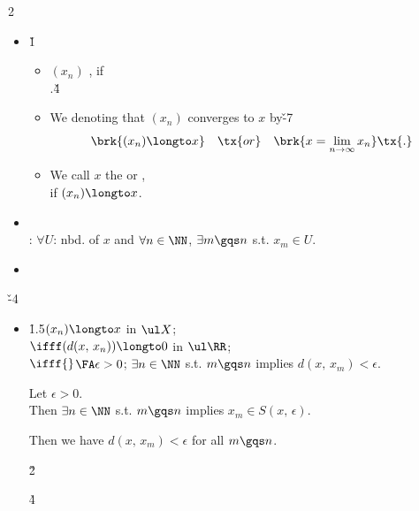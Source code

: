 \documentclass[dvipdfmx,a4paper,titlepage,9pt]{jsarticle}
\begin{document}
\begin{multicols*}{2}
\begin{itemize}[label=-]
\item{}\v1
\begin{itemize}[label=\Cdot]
\setlength{\leftskip}{-5pt}
\item $(x_n)$ , if \\
.\v4

\item We denoting that $(x_n)$ converges to $x$ by\v{-7}
$$\brk{(x_n)\longto x}\quad\tx{or}\quad \brk{x=\lim_{n\to\infty}x_n}\tx{.}$$

\item We call $x$ the  or , \\
if $(x_n)\longto x$.\\
\end{itemize}

\item{}\\
: $\forall U$: nbd. of $x$ and $\forall n\in\NN$, $\exists m\gqs n$ s.t. $x_m\in U$.\\

\item[]
\end{itemize}

\newpage

\v{-4}
\begin{itemize}[label=-]
\item \qquad\h{1.5}$(x_n)\longto x$ in $\ul X$; \\
$\ifff (d(x,\,x_n))\longto 0$ in $\ul \RR$; \\
$\ifff{}$$\FA\epsilon>0$; $\exists n\in\NN$ s.t. $m\gqs n$ implies $d(x,\,x_m)<\epsilon$.

\begin{Pfbox}[]
\ti{[(a)${}\Longto{}$(c)]} Let $\epsilon>0$. \\
Then $\exists n\in\NN$ s.t. $m\gqs n$ implies $x_m\in S(x,\,\epsilon)$.

Then we have $d(x,\,x_m)<\epsilon$ for all $m\gqs n$.\hfill\Sq

\dotfill\v2

\h4\ti{[(c)${}\Longto{}$(a)]} 


\end{Pfbox}
\end{itemize}
\end{multicols*}
\end{document}
